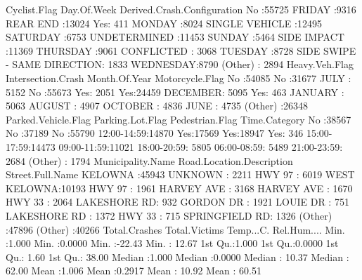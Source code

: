 \documentclass[11pt, a4paper]{article}
\begin{document}
\begin{Schunk}
\begin{Soutput}
 Cyclist.Flag    Day.Of.Week                Derived.Crash.Configuration
 No :55725    FRIDAY   :9316   REAR END                   :13024       
 Yes:  411    MONDAY   :8024   SINGLE VEHICLE             :12495       
              SATURDAY :6753   UNDETERMINED               :11453       
              SUNDAY   :5464   SIDE IMPACT                :11369       
              THURSDAY :9061   CONFLICTED                 : 3068       
              TUESDAY  :8728   SIDE SWIPE - SAME DIRECTION: 1833       
              WEDNESDAY:8790   (Other)                    : 2894       
 Heavy.Veh.Flag Intersection.Crash  Month.Of.Year   Motorcycle.Flag
 No :54085      No :31677          JULY    : 5152   No :55673      
 Yes: 2051      Yes:24459          DECEMBER: 5095   Yes:  463      
                                   JANUARY : 5063                  
                                   AUGUST  : 4907                  
                                   OCTOBER : 4836                  
                                   JUNE    : 4735                  
                                   (Other) :26348                  
 Parked.Vehicle.Flag Parking.Lot.Flag Pedestrian.Flag     Time.Category  
 No :38567           No :37189        No :55790       12:00-14:59:14870  
 Yes:17569           Yes:18947        Yes:  346       15:00-17:59:14473  
                                                      09:00-11:59:11021  
                                                      18:00-20:59: 5805  
                                                      06:00-08:59: 5489  
                                                      21:00-23:59: 2684  
                                                      (Other)    : 1794  
    Municipality.Name Road.Location.Description       Street.Full.Name
 KELOWNA     :45943   UNKNOWN     : 2211        HWY 97        : 6019  
 WEST KELOWNA:10193   HWY 97      : 1961        HARVEY AVE    : 3168  
                      HARVEY AVE  : 1670        HWY 33        : 2064  
                      LAKESHORE RD:  932        GORDON DR     : 1921  
                      LOUIE DR    :  751        LAKESHORE RD  : 1372  
                      HWY 33      :  715        SPRINGFIELD RD: 1326  
                      (Other)     :47896        (Other)       :40266  
 Total.Crashes   Total.Victims      Temp...C.       Rel.Hum....    
 Min.   :1.000   Min.   :0.0000   Min.   :-22.43   Min.   : 12.67  
 1st Qu.:1.000   1st Qu.:0.0000   1st Qu.:  1.60   1st Qu.: 38.00  
 Median :1.000   Median :0.0000   Median : 10.37   Median : 62.00  
 Mean   :1.006   Mean   :0.2917   Mean   : 10.92   Mean   : 60.51  

\end{Soutput}
\end{Schunk}
\end{document}
